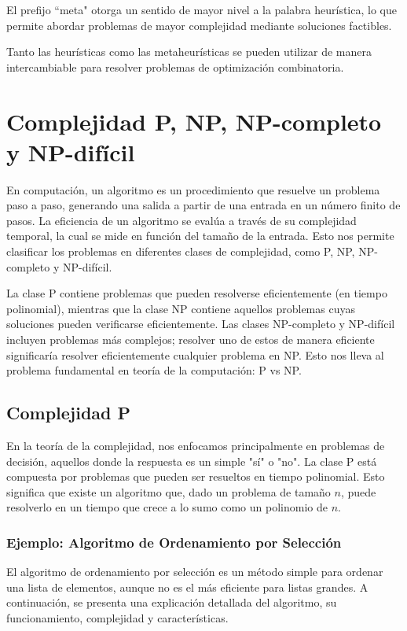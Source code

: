 \documentclass[12pt,titlepage,twoside,openright]{book}
\begin{document}
El prefijo ``meta" otorga un sentido de mayor nivel a la palabra heur\'istica, lo que permite abordar problemas de mayor complejidad mediante soluciones factibles.

Tanto las heur\'isticas como las metaheur\'isticas se pueden utilizar de manera intercambiable para resolver problemas de optimizaci\'on combinatoria.

\section{Complejidad P, NP, NP-completo y NP-dif\'icil}

En computaci\'on, un algoritmo es un procedimiento que resuelve un problema paso a paso, generando una salida a partir de una entrada en un n\'umero finito de pasos. La eficiencia de un algoritmo se eval\'ua a trav\'es de su complejidad temporal, la cual se mide en funci\'on del tama\~no de la entrada. Esto nos permite clasificar los problemas en diferentes clases de complejidad, como P, NP, NP-completo y NP-dif\'icil.

La clase P contiene problemas que pueden resolverse eficientemente (en tiempo polinomial), mientras que la clase NP contiene aquellos problemas cuyas soluciones pueden verificarse eficientemente. Las clases NP-completo y NP-dif\'icil incluyen problemas m\'as complejos; resolver uno de estos de manera eficiente significar\'ia resolver eficientemente cualquier problema en NP. Esto nos lleva al problema fundamental en teor\'ia de la computaci\'on: P vs NP.

\subsection{Complejidad P}

En la teor\'ia de la complejidad, nos enfocamos principalmente en problemas de decisi\'on, aquellos donde la respuesta es un simple "s\'i" o "no". La clase P est\'a compuesta por problemas que pueden ser resueltos en tiempo polinomial. Esto significa que existe un algoritmo que, dado un problema de tama\~no $n$, puede resolverlo en un tiempo que crece a lo sumo como un polinomio de $n$.

\subsubsection{Ejemplo: Algoritmo de Ordenamiento por Selecci\'on}

El algoritmo de ordenamiento por selecci\'on es un m\'etodo simple para ordenar una lista de elementos, aunque no es el m\'as eficiente para listas grandes. A continuaci\'on, se presenta una explicaci\'on detallada del algoritmo, su funcionamiento, complejidad y caracter\'isticas.
\end{document}
